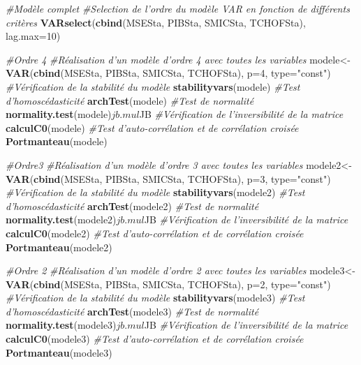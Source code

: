 \documentclass[11pt,]{article}
\newenvironment{Shaded}{\begin{snugshade}}{\end{snugshade}}
\newcommand{\KeywordTok}[1]{\textcolor[rgb]{0.13,0.29,0.53}{\textbf{{#1}}}}
\newcommand{\DataTypeTok}[1]{\textcolor[rgb]{0.13,0.29,0.53}{{#1}}}
\newcommand{\DecValTok}[1]{\textcolor[rgb]{0.00,0.00,0.81}{{#1}}}
\newcommand{\StringTok}[1]{\textcolor[rgb]{0.31,0.60,0.02}{{#1}}}
\newcommand{\CommentTok}[1]{\textcolor[rgb]{0.56,0.35,0.01}{\textit{{#1}}}}
\newcommand{\NormalTok}[1]{{#1}}
\begin{document}
\begin{Shaded}
\begin{Highlighting}[]
{\CommentTok{#Modèle complet}
\CommentTok{#Selection de l'ordre du modèle VAR en fonction de différents critères}
\KeywordTok{VARselect}\NormalTok{(}\KeywordTok{cbind}\NormalTok{(MSESta, PIBSta, SMICSta, TCHOFSta), }\DataTypeTok{lag.max=}\DecValTok{10}\NormalTok{)}

\CommentTok{#Ordre 4}
\CommentTok{#Réalisation d'un modèle d'ordre 4 avec toutes les variables}
\NormalTok{modele<-}\KeywordTok{VAR}\NormalTok{(}\KeywordTok{cbind}\NormalTok{(MSESta, PIBSta, SMICSta, TCHOFSta), }\DataTypeTok{p=}\DecValTok{4}\NormalTok{, }\DataTypeTok{type=}\StringTok{"const"}\NormalTok{)}
\CommentTok{#Vérification de la stabilité du modèle}
\KeywordTok{stabilityvars}\NormalTok{(modele)}
\CommentTok{#Test d'homoscédasticité}
\KeywordTok{archTest}\NormalTok{(modele)}
\CommentTok{#Test de normalité}
\KeywordTok{normality.test}\NormalTok{(modele)$jb.mul$JB}
\CommentTok{#Vérification de l'inversibilité de la matrice}
\KeywordTok{calculC0}\NormalTok{(modele)}
\CommentTok{#Test d'auto-corrélation et de corrélation croisée}
\KeywordTok{Portmanteau}\NormalTok{(modele)}

\CommentTok{#Ordre3}
\CommentTok{#Réalisation d'un modèle d'ordre 3 avec toutes les variables}
\NormalTok{modele2<-}\KeywordTok{VAR}\NormalTok{(}\KeywordTok{cbind}\NormalTok{(MSESta, PIBSta, SMICSta, TCHOFSta), }\DataTypeTok{p=}\DecValTok{3}\NormalTok{, }\DataTypeTok{type=}\StringTok{"const"}\NormalTok{)}
\CommentTok{#Vérification de la stabilité du modèle}
\KeywordTok{stabilityvars}\NormalTok{(modele2)}
\CommentTok{#Test d'homoscédasticité}
\KeywordTok{archTest}\NormalTok{(modele2)}
\CommentTok{#Test de normalité}
\KeywordTok{normality.test}\NormalTok{(modele2)$jb.mul$JB}
\CommentTok{#Vérification de l'inversibilité de la matrice}
\KeywordTok{calculC0}\NormalTok{(modele2)}
\CommentTok{#Test d'auto-corrélation et de corrélation croisée}
\KeywordTok{Portmanteau}\NormalTok{(modele2)}

\CommentTok{#Ordre 2}
\CommentTok{#Réalisation d'un modèle d'ordre 2 avec toutes les variables}
\NormalTok{modele3<-}\KeywordTok{VAR}\NormalTok{(}\KeywordTok{cbind}\NormalTok{(MSESta, PIBSta, SMICSta, TCHOFSta), }\DataTypeTok{p=}\DecValTok{2}\NormalTok{, }\DataTypeTok{type=}\StringTok{"const"}\NormalTok{)}
\CommentTok{#Vérification de la stabilité du modèle}
\KeywordTok{stabilityvars}\NormalTok{(modele3)}
\CommentTok{#Test d'homoscédasticité}
\KeywordTok{archTest}\NormalTok{(modele3)}
\CommentTok{#Test de normalité}
\KeywordTok{normality.test}\NormalTok{(modele3)$jb.mul$JB}
\CommentTok{#Vérification de l'inversibilité de la matrice}
\KeywordTok{calculC0}\NormalTok{(modele3)}
\CommentTok{#Test d'auto-corrélation et de corrélation croisée}
\KeywordTok{Portmanteau}\NormalTok{(modele3)}

}
\end{Highlighting}
\end{Shaded}
\end{document}
